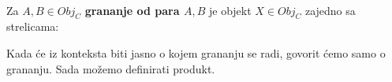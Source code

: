   \begin{definition}\ \\
  
    \noindent Za $A, B \in Obj_C$ \textbf{grananje od para $A, B$} je objekt $X \in
    Obj_C$
    zajedno sa strelicama:
  \begin{center}
  \end{center}
  \end{definition}
  
  Kada će iz konteksta biti jasno o kojem grananju se radi, govorit ćemo
  samo o grananju. Sada možemo definirati produkt.\\
  
